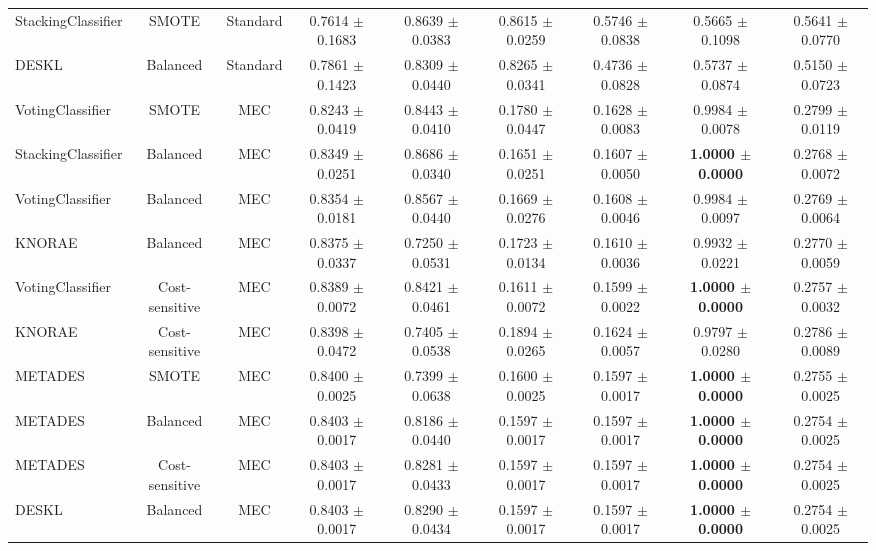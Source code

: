 \documentclass[conference]{IEEEtran}
\begin{document}
\begin{table}[h]
\begin{threeparttable}
{\begin{tabular}{lcc|cccccc}
            StackingClassifier & SMOTE & Standard & 0.7614 $\pm$ 0.1683 & 0.8639 $\pm$ 0.0383 & 0.8615 $\pm$ 0.0259 & 0.5746 $\pm$ 0.0838 & 0.5665 $\pm$ 0.1098 & 0.5641 $\pm$ 0.0770 \\
            DESKL & Balanced & Standard & 0.7861 $\pm$ 0.1423 & 0.8309 $\pm$ 0.0440 & 0.8265 $\pm$ 0.0341 & 0.4736 $\pm$ 0.0828 & 0.5737 $\pm$ 0.0874 & 0.5150 $\pm$ 0.0723 \\
            VotingClassifier & SMOTE & MEC & 0.8243 $\pm$ 0.0419 & 0.8443 $\pm$ 0.0410 & 0.1780 $\pm$ 0.0447 & 0.1628 $\pm$ 0.0083 & 0.9984 $\pm$ 0.0078 & 0.2799 $\pm$ 0.0119 \\
            StackingClassifier & Balanced & MEC & 0.8349 $\pm$ 0.0251 & 0.8686 $\pm$ 0.0340 & 0.1651 $\pm$ 0.0251 & 0.1607 $\pm$ 0.0050 & \textbf{1.0000 $\pm$ 0.0000} & 0.2768 $\pm$ 0.0072 \\
            VotingClassifier & Balanced & MEC & 0.8354 $\pm$ 0.0181 & 0.8567 $\pm$ 0.0440 & 0.1669 $\pm$ 0.0276 & 0.1608 $\pm$ 0.0046 & 0.9984 $\pm$ 0.0097 & 0.2769 $\pm$ 0.0064 \\
            KNORAE & Balanced & MEC & 0.8375 $\pm$ 0.0337 & 0.7250 $\pm$ 0.0531 & 0.1723 $\pm$ 0.0134 & 0.1610 $\pm$ 0.0036 & 0.9932 $\pm$ 0.0221 & 0.2770 $\pm$ 0.0059 \\
            VotingClassifier & Cost-sensitive & MEC & 0.8389 $\pm$ 0.0072 & 0.8421 $\pm$ 0.0461 & 0.1611 $\pm$ 0.0072 & 0.1599 $\pm$ 0.0022 & \textbf{1.0000 $\pm$ 0.0000} & 0.2757 $\pm$ 0.0032 \\
            KNORAE & Cost-sensitive & MEC & 0.8398 $\pm$ 0.0472 & 0.7405 $\pm$ 0.0538 & 0.1894 $\pm$ 0.0265 & 0.1624 $\pm$ 0.0057 & 0.9797 $\pm$ 0.0280 & 0.2786 $\pm$ 0.0089 \\
            METADES & SMOTE & MEC & 0.8400 $\pm$ 0.0025 & 0.7399 $\pm$ 0.0638 & 0.1600 $\pm$ 0.0025 & 0.1597 $\pm$ 0.0017 & \textbf{1.0000 $\pm$ 0.0000} & 0.2755 $\pm$ 0.0025 \\
            METADES & Balanced & MEC & 0.8403 $\pm$ 0.0017 & 0.8186 $\pm$ 0.0440 & 0.1597 $\pm$ 0.0017 & 0.1597 $\pm$ 0.0017 & \textbf{1.0000 $\pm$ 0.0000} & 0.2754 $\pm$ 0.0025 \\
            METADES & Cost-sensitive & MEC & 0.8403 $\pm$ 0.0017 & 0.8281 $\pm$ 0.0433 & 0.1597 $\pm$ 0.0017 & 0.1597 $\pm$ 0.0017 & \textbf{1.0000 $\pm$ 0.0000} & 0.2754 $\pm$ 0.0025 \\
            DESKL & Balanced & MEC & 0.8403 $\pm$ 0.0017 & 0.8290 $\pm$ 0.0434 & 0.1597 $\pm$ 0.0017 & 0.1597 $\pm$ 0.0017 & \textbf{1.0000 $\pm$ 0.0000} & 0.2754 $\pm$ 0.0025 \\

\end{tabular}}
\end{threeparttable}
\end{table}
\end{document}
